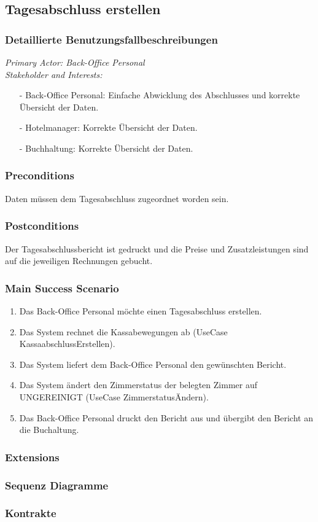 \documentclass[./detailed_overview_usecases.tex]{subfiles}
\begin{document}
    \subsection{Tagesabschluss erstellen}
    \subsubsection{Detaillierte Benutzungsfallbeschreibungen}
    \textit{Primary Actor: Back-Office Personal}
    \\
    \textit{Stakeholder and Interests:}
    \begin{itemize}
        \item[-] Back-Office Personal: Einfache Abwicklung des Abschlusses und korrekte Übersicht der Daten.
        \item[-] Hotelmanager: Korrekte Übersicht der Daten.
        \item[-] Buchhaltung: Korrekte Übersicht der Daten.
    \end{itemize}

    \subsubsection*{Preconditions}
    Daten müssen dem Tagesabschluss zugeordnet worden sein.
    \subsubsection*{Postconditions}
    Der Tagesabschlussbericht ist gedruckt und die Preise und Zusatzleistungen sind auf die jeweiligen Rechnungen gebucht.

    \subsubsection*{Main Success Scenario}
    \begin{enumerate}
        \item Das Back-Office Personal möchte einen Tagesabschluss erstellen.
        \item Das System rechnet die Kassabewegungen ab (UseCase KassaabschlussErstellen).
        \item Das System liefert dem Back-Office Personal den gewünschten Bericht.
        \item Das System ändert den Zimmerstatus der belegten Zimmer auf UNGEREINIGT (UseCase ZimmerstatusÄndern).
        \item Das Back-Office Personal druckt den Bericht aus und übergibt den Bericht an die Buchaltung.
    \end{enumerate}

    \subsubsection*{Extensions}

    \subsubsection{Sequenz Diagramme}
    \subsubsection{Kontrakte}
\end{document}
